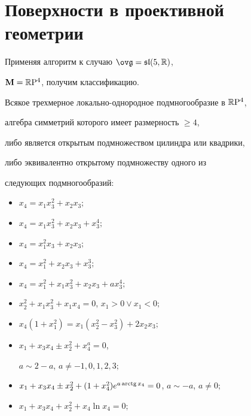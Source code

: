 \section{Поверхности в проективной геометрии}





Применяя алгоритм к случаю $\gb=\sln(5,\Bbb R)$,


$\bold M=\Bbb R\mathrm P^4$, получим классификацию.





\begin{thm}\label{t:p}


Всякое трехмерное локально-однородное подмногообразие в $\Bbb R\mathrm P^4$, 


алгебра симметрий которого имеет размерность $\ge 4$,


либо является открытым подмножеством цилиндра или квадрики,


либо эквивалентно открытому подмножеству одного из


следующих подмногообразий$:$


\begin{itemize}


\item[$(1)$] $x_4=x_1x_3^2+x_2x_3;$


\item[$(2)$] $x_4=x_1x_3^2+x_2x_3+x_3^4;$


\item[$(3)$] $x_4=x_1^2x_3+x_2x_3;$


\item[$(4)$] $x_4=x_1^2+x_2x_3+x_3^3;$


\item[$(5)$] $x_4=x_1^2+x_1x_3^2+x_2x_3+a x_3^4;$


\item[$(6)$] $x_2^2+x_1x_3^2+x_1x_4=0$, $x_1>0\lor x_1<0;$ 


\item[$(7)$] $x_4(1+ x_1^2)=x_1(x_2^2- x_3^2)+2x_2x_3;$


\item[$(8)$] $x_1+x_3x_4\pm x_2^2+x_4^{a}=0$, 


$a\sim 2-a$, $a\ne -1,0,1,2,3;$


\item[$(9)$] $x_1+x_3x_4\pm x_2^2+(1+x_4^2)e^{a\arctg 


x_4}=0$, $a\sim -a$, $a\ne0;$


\item[$(10)$] $x_1+x_3x_4+ x_2^2+x_4\ln x_4=0;$



\end{itemize}
\end{thm}
